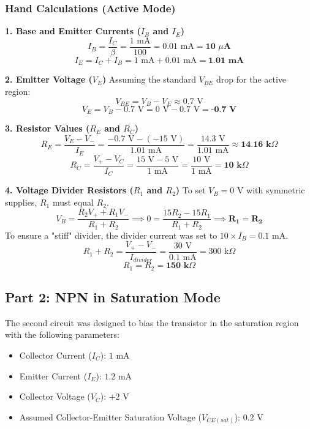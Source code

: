 \subsubsection*{Hand Calculations (Active Mode)}
\textbf{1. Base and Emitter Currents ($I_B$ and $I_E$)}
\[ I_{B} = \frac{I_{C}}{\beta} = \frac{1 \text{ mA}}{100} = 0.01 \text{ mA} = \textbf{10 } \mu\textbf{A} \]
\[ I_{E} = I_{C} + I_{B} = 1 \text{ mA} + 0.01 \text{ mA} = \textbf{1.01 mA} \]

\textbf{2. Emitter Voltage ($V_E$)}
Assuming the standard $V_{BE}$ drop for the active region:
\[ V_{BE} = V_B - V_E \approx 0.7 \text{ V} \]
\[ V_E = V_B - 0.7 \text{ V} = 0 \text{ V} - 0.7 \text{ V} = \textbf{-0.7 V} \]

\textbf{3. Resistor Values ($R_E$ and $R_C$)}
\[ R_{E} = \frac{V_{E} - V_{-}}{I_{E}} = \frac{-0.7 \text{ V} - (-15 \text{ V})}{1.01 \text{ mA}} = \frac{14.3 \text{ V}}{1.01 \text{ mA}} \approx \textbf{14.16 k}\Omega \]
\[ R_{C} = \frac{V_{+} - V_{C}}{I_{C}} = \frac{15 \text{ V} - 5 \text{ V}}{1 \text{ mA}} = \frac{10 \text{ V}}{1 \text{ mA}} = \textbf{10 k}\Omega \]

\textbf{4. Voltage Divider Resistors ($R_1$ and $R_2$)}
To set $V_B = 0 \text{ V}$ with symmetric supplies, $R_1$ must equal $R_2$.
\[ V_{B} = \frac{R_2 V_+ + R_1 V_-}{R_1 + R_2} \implies 0 = \frac{15R_2 - 15R_1}{R_1+R_2} \implies \textbf{R}_{\textbf{1}} = \textbf{R}_{\textbf{2}} \]
To ensure a "stiff" divider, the divider current was set to $10 \times I_B = 0.1 \text{ mA}$.
\[ R_1 + R_2 = \frac{V_+ - V_-}{I_{divider}} = \frac{30 \text{ V}}{0.1 \text{ mA}} = 300 \text{ k}\Omega \]
\[ R_1 = R_2 = \textbf{150 k}\Omega \]

\subsection*{Part 2: NPN in Saturation Mode}
The second circuit was designed to bias the transistor in the saturation region with the following parameters:
\begin{itemize}
    \item Collector Current ($I_C$): $1 \text{ mA}$
    \item Emitter Current ($I_E$): $1.2 \text{ mA}$
    \item Collector Voltage ($V_C$): $+2 \text{ V}$
    \item Assumed Collector-Emitter Saturation Voltage ($V_{CE(sat)}$): $0.2 \text{ V}$
\end{itemize}

